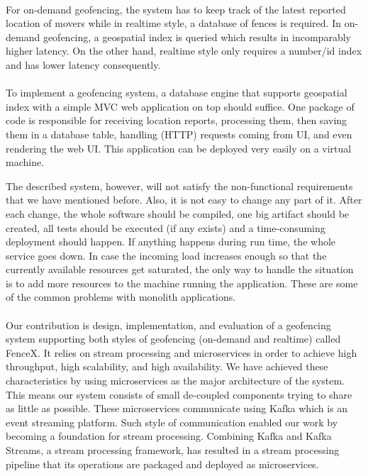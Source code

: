 \documentclass[a4]{report}
\begin{document}
    \paragraph{}
    For on-demand geofencing, the system has to keep track of the latest reported location of movers while in realtime
    style, a database of fences is required.
    In on-demand geofencing, a geospatial index is queried which results in incomparably higher latency.
    On the other hand, realtime style only requires a number/id index and has lower latency consequently.

    \paragraph{}
    To implement a geofencing system, a database engine that supports geospatial index with a simple MVC\cite{mvc}
    web application on top should suffice.
    One package of code is responsible for receiving location reports, processing them, then saving them in
    a database table, handling (HTTP) requests coming from UI, and even rendering the web UI.
    This application can be deployed very easily on a virtual machine.

    The described system, however, will not satisfy the non-functional requirements that we have mentioned before.
    Also, it is not easy to change any part of it.
    After each change, the whole software should be compiled, one big artifact should be created, all tests should be
    executed (if any exists) and a time-consuming deployment should happen.
    If anything happens during run time, the whole service goes down.
    In case the incoming load increases enough so that the currently available resources get saturated, the only way to
    handle the situation is to add more resources to the machine running the application.
    These are some of the common problems with monolith\cite{monolith} applications.

    \paragraph{}
    Our contribution is design, implementation, and evaluation of a geofencing system supporting both styles of
    geofencing (on-demand and realtime) called FenceX\cite{fencex}.
    It relies on stream processing\cite{making-sense-of-stream-processing} and microservices\cite{microservices} in
    order to achieve high throughput, high scalability, and high availability.
    We have achieved these characteristics by using microservices as the major architecture of the system.
    This means our system consists of small de-coupled components trying to share as little as possible.
    These microservices communicate using Kafka\cite{kafka} which is an event streaming\cite{design-event-driven-systems} platform.
    Such style of communication enabled our work by becoming a foundation for stream processing.
    Combining Kafka and Kafka Streams\cite{KafkaStreams}, a stream processing framework, has resulted in a
    stream processing pipeline that its operations are packaged and deployed as microservices.
\end{document}
